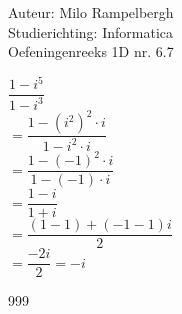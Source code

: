 \documentclass[a4paper]{article}
\begin{document}
\noindent \large Auteur: Milo Rampelbergh \\
\noindent \large Studierichting: Informatica\\
\noindent \large Oefeningenreeks 1D nr. 6.7\\

\medskip

\normalsize


$ \dfrac{1-i^5}{1-i^3} $ \\

$ = \dfrac{1-(i^2)^2 \cdot i}{1-i^2 \cdot i} $ \\

$ = \dfrac{1-(-1)^2 \cdot i}{1 - (-1) \cdot i} $ \\

$ = \dfrac{1-i}{1+i} $ \\

$ = \dfrac{(1-1) + (-1-1)i}{2} $ \\

$ = \dfrac{-2i}{2} = -i $ \\



\begin{thebibliography}{999}
\end{thebibliography}
\end{document}
